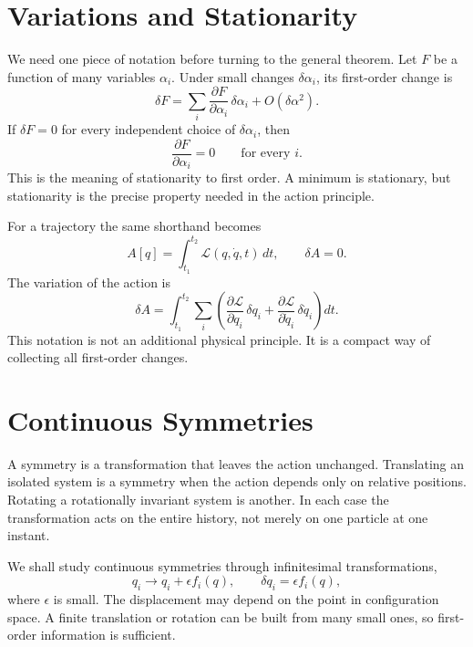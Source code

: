 \section{Variations and Stationarity}

We need one piece of notation before turning to the general theorem. Let
\(F\) be a function of many variables \(\alpha_i\). Under small changes
\(\delta\alpha_i\), its first-order change is
\begin{equation}
 \delta F
 =\sum_i\frac{\partial F}{\partial\alpha_i}\,\delta\alpha_i
 +O(\delta\alpha^2).
 \label{eq:l04-first-variation-function}
\end{equation}
If \(\delta F=0\) for every independent choice of \(\delta\alpha_i\), then
\begin{equation}
 \frac{\partial F}{\partial\alpha_i}=0
 \qquad\text{for every }i.
\end{equation}
This is the meaning of stationarity to first order. A minimum is stationary,
but stationarity is the precise property needed in the action principle.

For a trajectory the same shorthand becomes
\begin{equation}
 A[q]=\int_{t_1}^{t_2}\mathcal L(q,\dot q,t)\,dt,
 \qquad \delta A=0.
\end{equation}
The variation of the action is
\begin{equation}
 \delta A
 =\int_{t_1}^{t_2}
 \sum_i\left(
 \frac{\partial\mathcal L}{\partial q_i}\,\delta q_i
 +\frac{\partial\mathcal L}{\partial\dot q_i}\,\delta\dot q_i
 \right)dt.
 \label{eq:l04-first-variation-action}
\end{equation}
This notation is not an additional physical principle. It is a compact way of
collecting all first-order changes.

\section{Continuous Symmetries}

A symmetry is a transformation that leaves the action unchanged. Translating
an isolated system is a symmetry when the action depends only on relative
positions. Rotating a rotationally invariant system is another. In each case
the transformation acts on the entire history, not merely on one particle at
one instant.

We shall study continuous symmetries through infinitesimal transformations,
\begin{equation}
 q_i\longrightarrow q_i+\epsilon f_i(q),
 \qquad
 \delta q_i=\epsilon f_i(q),
 \label{eq:l04-infinitesimal-symmetry}
\end{equation}
where \(\epsilon\) is small. The displacement may depend on the point in
configuration space. A finite translation or rotation can be built from many
small ones, so first-order information is sufficient.

